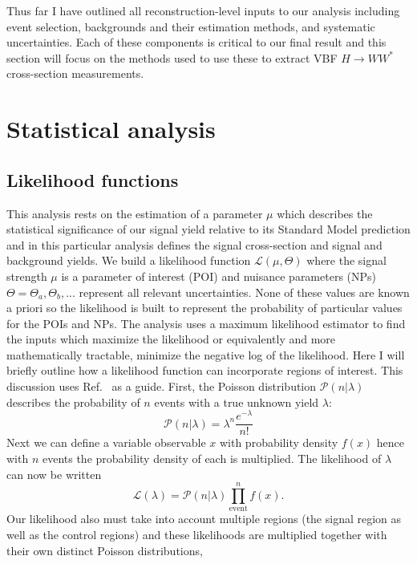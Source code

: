Thus far I have outlined all reconstruction-level inputs to our analysis including event selection, backgrounds and their estimation methods, and systematic uncertainties. Each of these components is critical to our final result and this section will focus on the methods used to use these to extract VBF $H\rightarrow WW^*$ cross-section measurements. 
\section{Statistical analysis}
\subsection{Likelihood functions}
This analysis rests on the estimation of a parameter $\mu$ which describes the statistical significance of our signal yield relative to its Standard Model prediction and in this particular analysis defines the signal cross-section and signal and background yields. We build a likelihood function $\mathcal{L}(\mu,\Theta)$ where the signal strength $\mu$ is a parameter of interest (POI) and nuisance parameters (NPs) $\Theta=\Theta_a,\Theta_b,...$ represent all relevant uncertainties. None of these values are known a priori so the likelihood is built to represent the probability of particular values for the POIs and NPs. The analysis uses a maximum likelihood estimator to find the inputs which maximize the likelihood or equivalently and more mathematically tractable, minimize the negative log of the likelihood. Here I will briefly outline how a likelihood function can incorporate regions of interest. This discussion uses Ref.~\cite{cranmer2015practical} as a guide. First, the Poisson distribution $\mathcal{P}(n|\lambda)$ describes the probability of $n$ events with a true unknown yield $\lambda$:
\begin{equation}
\mathcal{P}(n|\lambda)= \lambda^n\frac{e^{-\lambda}}{n!}
\end{equation}
Next we can define a variable observable $x$ with probability density $f(x)$ hence with $n$ events the probability density of each is multiplied. The likelihood of $\lambda$ can now be written
\begin{equation}
\mathcal{L}(\lambda)=\mathcal{P}(n|\lambda)\prod_{\text{event}}^n f(x).
\end{equation}
Our likelihood also must take into account multiple regions (the signal region as well as the control regions) and these likelihoods are multiplied together with their own distinct Poisson distributions,
